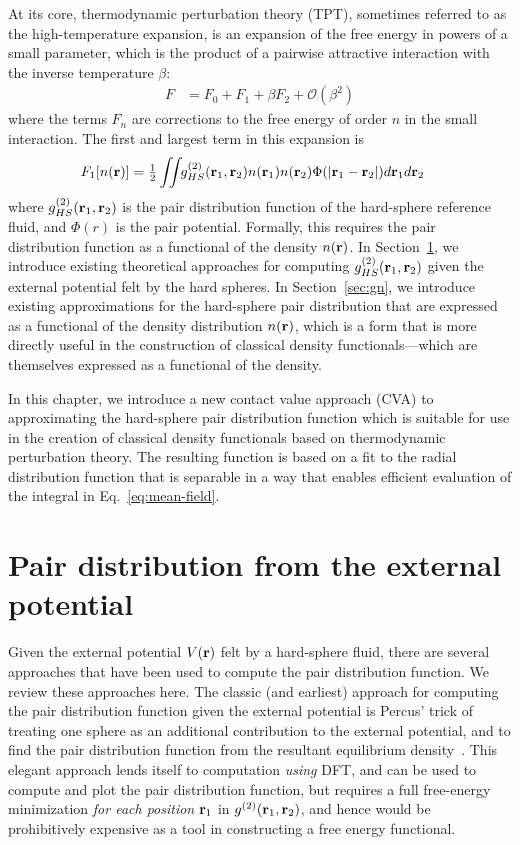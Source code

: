 At its core, thermodynamic perturbation theory (TPT), sometimes referred to
as the high-temperature expansion, is an expansion of the
free energy in powers of a small parameter, which is the
product of a
pairwise attractive interaction with the inverse temperature $\beta$:
\begin{align}
  F &= F_0 + F_1 + \beta F_2 + \mathcal{O}(\beta^2)
\end{align}
where the terms $F_n$ are corrections to the free energy of order $n$
in the small interaction.  The first and largest term in this
expansion is
\begin{align}
  F_1[n(\textbf{r})] &= \tfrac12 \iint \!\!
  g^{(2)}_{HS}(\textbf{r}_1,\textbf{r}_2)n(\textbf{r}_1)n(\textbf{r}_2)\Phi(|\textbf{r}_1-\textbf{r}_2|)
  d\textbf{r}_1d\textbf{r}_2
  \label{eq:mean-field}
\end{align}
where $g^{(2)}_{HS}(\textbf{r}_1,\textbf{r}_2)$ is the pair distribution function of
the hard-sphere reference fluid, and $\Phi(r)$ is the pair potential.
Formally, this requires the pair distribution function as a functional
of the density $n(\textbf{r})$.  In Section~\ref{sec:gV}, we introduce
existing theoretical approaches for computing
$g^{(2)}_{HS}(\textbf{r}_1,\textbf{r}_2)$ given the external potential felt by the
hard spheres.  In Section~\ref{sec:gn}, we introduce existing
approximations for the hard-sphere pair distribution that are
expressed as a functional of the density distribution $n(\textbf{r})$, which
is a form that is more directly useful in the construction of
classical density functionals---which are themselves expressed as a
functional of the density.

In this chapter, we introduce a new contact value approach
(CVA) to approximating the hard-sphere pair distribution function
which is suitable for use in the creation of classical density
functionals based on thermodynamic perturbation theory. The resulting
function is based on a fit to the radial distribution function that is
separable in a way that enables efficient evaluation of the
integral in Eq.~\ref{eq:mean-field}.

\section{Pair distribution from the external potential}\label{sec:gV}

Given the external potential $V(\textbf{r})$ felt by a hard-sphere fluid,
there are several approaches that have been used to compute the pair
distribution function.  We review these approaches here.  The
classic (and earliest) approach for computing the pair distribution
function given the external potential is Percus' trick of treating one
sphere as an additional contribution to the external potential, and to
find the pair distribution function from the resultant equilibrium
density~\cite{hansen2006theory}.  This elegant approach lends itself
to computation \emph{using} DFT, and can be used to compute and plot the pair
distribution function, but requires a full free-energy minimization
\emph{for each position} $\textbf{r}_1$ in $g^{(2)}(\textbf{r}_1,\textbf{r}_2)$, and hence
would be prohibitively expensive as a tool in constructing a free
energy functional.

